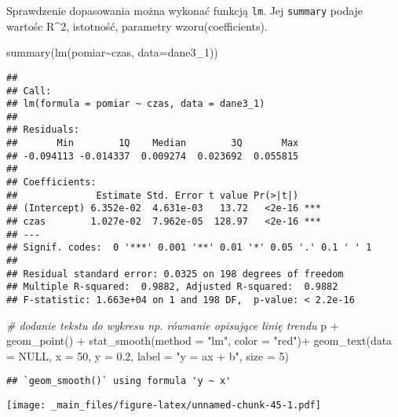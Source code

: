 \documentclass[
]{book}
\newenvironment{Shaded}{\begin{snugshade}}{\end{snugshade}}
\newcommand{\AttributeTok}[1]{\textcolor[rgb]{0.77,0.63,0.00}{#1}}
\newcommand{\CommentTok}[1]{\textcolor[rgb]{0.56,0.35,0.01}{\textit{#1}}}
\newcommand{\ConstantTok}[1]{\textcolor[rgb]{0.00,0.00,0.00}{#1}}
\newcommand{\DecValTok}[1]{\textcolor[rgb]{0.00,0.00,0.81}{#1}}
\newcommand{\FloatTok}[1]{\textcolor[rgb]{0.00,0.00,0.81}{#1}}
\newcommand{\FunctionTok}[1]{\textcolor[rgb]{0.00,0.00,0.00}{#1}}
\newcommand{\NormalTok}[1]{#1}
\newcommand{\SpecialCharTok}[1]{\textcolor[rgb]{0.00,0.00,0.00}{#1}}
\newcommand{\StringTok}[1]{\textcolor[rgb]{0.31,0.60,0.02}{#1}}
\begin{document}
Sprawdzenie dopasowania można wykonać funkcją \texttt{lm}. Jej \texttt{summary} podaje wartośc R\^{}2, istotność, parametry wzoru(coefficients).

\begin{Shaded}
\begin{Highlighting}[]
\FunctionTok{summary}\NormalTok{(}\FunctionTok{lm}\NormalTok{(pomiar}\SpecialCharTok{\textasciitilde{}}\NormalTok{czas, }\AttributeTok{data=}\NormalTok{dane3\_1))}
\end{Highlighting}
\end{Shaded}

\begin{verbatim}
## 
## Call:
## lm(formula = pomiar ~ czas, data = dane3_1)
## 
## Residuals:
##       Min        1Q    Median        3Q       Max 
## -0.094113 -0.014337  0.009274  0.023692  0.055815 
## 
## Coefficients:
##              Estimate Std. Error t value Pr(>|t|)    
## (Intercept) 6.352e-02  4.631e-03   13.72   <2e-16 ***
## czas        1.027e-02  7.962e-05  128.97   <2e-16 ***
## ---
## Signif. codes:  0 '***' 0.001 '**' 0.01 '*' 0.05 '.' 0.1 ' ' 1
## 
## Residual standard error: 0.0325 on 198 degrees of freedom
## Multiple R-squared:  0.9882, Adjusted R-squared:  0.9882 
## F-statistic: 1.663e+04 on 1 and 198 DF,  p-value: < 2.2e-16
\end{verbatim}

\begin{Shaded}
\begin{Highlighting}[]
\CommentTok{\# dodanie tekstu do wykresu np. równanie opisujące linię trendu}
\NormalTok{p }\SpecialCharTok{+} \FunctionTok{geom\_point}\NormalTok{() }\SpecialCharTok{+} \FunctionTok{stat\_smooth}\NormalTok{(}\AttributeTok{method =} \StringTok{"lm"}\NormalTok{, }\AttributeTok{color =} \StringTok{"red"}\NormalTok{)}\SpecialCharTok{+}
  \FunctionTok{geom\_text}\NormalTok{(}\AttributeTok{data =} \ConstantTok{NULL}\NormalTok{, }\AttributeTok{x =} \DecValTok{50}\NormalTok{, }\AttributeTok{y =} \FloatTok{0.2}\NormalTok{, }\AttributeTok{label =} \StringTok{"y = ax + b"}\NormalTok{, }\AttributeTok{size =} \DecValTok{5}\NormalTok{)}
\end{Highlighting}
\end{Shaded}

\begin{verbatim}
## `geom_smooth()` using formula 'y ~ x'
\end{verbatim}

\texttt{[image: \_main\_files/figure-latex/unnamed-chunk-45-1.pdf]}
\end{document}
